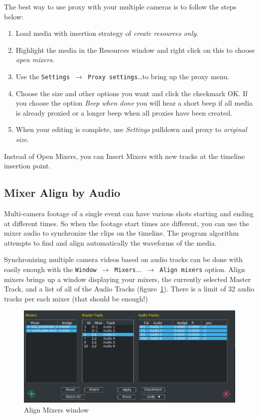 The best way to use proxy with your multiple cameras is to follow the steps below:

\begin{enumerate}
    \item Load media with insertion strategy of \textit{create resources only}.
    \item Highlight the media in the Resources window and right click on this to choose \textit{open mixers}.
    \item Use the \texttt{Settings $\rightarrow$ Proxy settings}\dots to bring up the proxy menu.
    \item Choose the size and other options you want and click the checkmark OK. If you choose the option \textit{Beep when done} you will hear a short beep if all media is already proxied or a longer beep when all proxies have been created.
    \item When your editing is complete, use \textit{Settings} pulldown and proxy to \textit{original size}.
\end{enumerate}

Instead of Open Mixers, you can Insert Mixers with new tracks at the timeline insertion point.

\subsection{Mixer Align by Audio}%
\label{sub:mixer_align_audio}

Multi-camera footage of a single event can have various shots starting and ending at different times. So when the footage start times are different, you can use the mixer audio to synchronize the clips on the timeline. The program algorithm attempts to find and align automatically the waveforms of the media.

Synchronizing multiple camera videos based on audio tracks can be done with \CGG{} easily enough with the \texttt{Window $\rightarrow$ Mixers$\dots$ $\rightarrow$  Align mixers} option.  Align mixers brings up a window displaying your mixers, the currently selected Master Track, and a list of all of the Audio Tracks (figure~\ref{fig:mixer-align01}).  There is a limit of 32 audio tracks per each mixer (that should be enough!)

\begin{figure}[htpb]
    \centering
    \includegraphics[width=0.9\linewidth]{images/mixer-align01.png}
    \caption{Align Mixers window}
    \label{fig:mixer-align01}
\end{figure}

